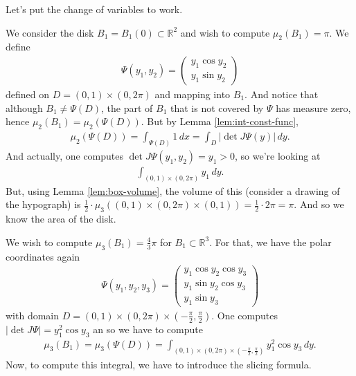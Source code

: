 Let's put the change of variables to work.

\begin{eg}
	We consider the disk $B_{1} = B_{1}(0) \subset \mathbb{R}^{2}$ and wish to compute $\mu_{2}(B_{1}) = \pi$. We define
	\begin{align*}
		\Psi(y_{1}, y_{2}) = \begin{pmatrix} y_{1} \cos y_{2} \\ y_{1} \sin y_{2} \end{pmatrix}
	\end{align*}
	defined on $D = (0,1) \times (0, 2\pi)$ and mapping into $B_{1}$. And notice that although $B_{1} \neq \Psi(D)$, the part of $B_{1}$ that is not covered by $\Psi$ has measure zero, hence $\mu_{2}(B_{1}) = \mu_{2}(\Psi(D))$. But by Lemma \ref{lem:int-const-func},
	\begin{align*}
		\mu_{2}(\Psi(D)) = \int_{\Psi(D)} 1 \, dx = \int_{D} \left| \det J \Psi(y) \right| \, dy.
	\end{align*}
	And actually, one computes $\det J \Psi(y_{1}, y_{2}) = y_{1} > 0$, so we're looking at
	\begin{align*}
		\int_{(0,1) \times (0,2\pi)} y_{1} \, dy.
	\end{align*}
	But, using Lemma \ref{lem:box-volume}, the volume of this (consider a drawing of the hypograph) is $\frac{1}{2} \cdot \mu_{3}((0,1) \times (0,2\pi) \times (0,1)) = \frac{1}{2} \cdot 2\pi = \pi$. And so we know the area of the disk.
\end{eg}

\begin{eg}
	We wish to compute $\mu_{3}(B_{1}) = \frac{4}{3} \pi$ for $B_{1} \subset \mathbb{R}^{3}$. For that, we have the polar coordinates again
	\begin{align*}
		\Psi(y_{1}, y_{2}, y_{3}) =
		\begin{pmatrix}
			y_{1} \cos y_{2} \cos y_{3} \\
			y_{1} \sin y_{2} \cos y_{3} \\
			y_{1} \sin y_{3}
		\end{pmatrix}
	\end{align*}
	with domain $D = (0,1) \times (0,2\pi) \times (-\tfrac{\pi}{2}, \tfrac{\pi}{2})$. One computes $\left| \det J \Psi \right| = y_{1}^{2} \cos y_{3}$ an so we have to compute
	\begin{align*}
		\mu_{3}(B_{1}) = \mu_{3}(\Psi(D)) = \int_{(0,1) \times (0, 2\pi) \times \left(-\tfrac{\pi}{2}, \tfrac{\pi}{2}\right)} y_{1}^{2} \cos y_{3} \, dy.
	\end{align*}
	Now, to compute this integral, we have to introduce the slicing formula.
\end{eg}


